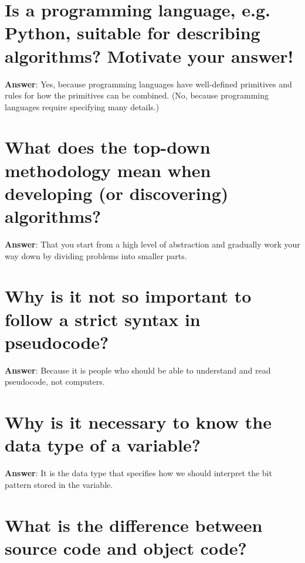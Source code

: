 \documentclass[a4paper,11pt,oneside]{book}
\begin{document}
\begin{sloppypar}
\section{Is a programming language, e.g. Python, suitable for describing algorithms? Motivate your answer!}

\label{q:188:sa:en:True}

\textbf{Answer}: Yes, because programming languages have well-defined primitives and rules for how the primitives can be combined. (No, because programming languages require specifying many details.)



\section{What does the top-down methodology mean when developing (or discovering) algorithms?}

\label{q:189:sa:en:True}

\textbf{Answer}: That you start from a high level of abstraction and gradually work your way down by dividing problems into smaller parts.



\section{Why is it not so important to follow a strict syntax in pseudocode?}

\label{q:190:sa:en:True}

\textbf{Answer}: Because it is people who should be able to understand and read pseudocode, not computers.



\section{Why is it necessary to know the data type of a variable?}

\label{q:191:sa:en:True}

\textbf{Answer}: It is the data type that specifies how we should interpret the bit pattern stored in the variable.



\section{What is the difference between source code and object code?}

\label{q:192:sa:en:True}


\end{sloppypar}
\end{document}
